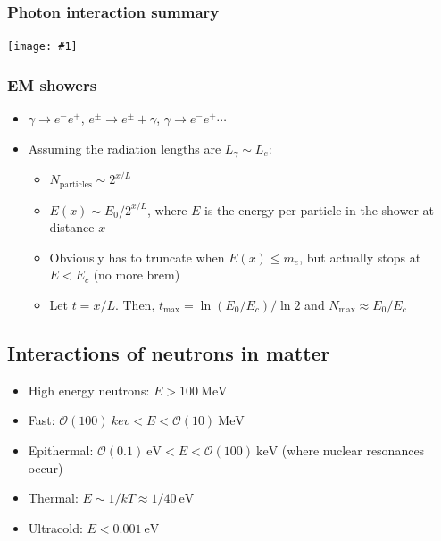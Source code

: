 \documentclass[11pt]{article}
\newcommand{\ev}{\text{eV}}
\newcommand{\kev}{\text{keV}}
\newcommand{\mev}{\text{MeV}}
\newcommand{\el}{\ensuremath{e^{-}}\xspace}
\newcommand{\pos}{\ensuremath{e^{+}}\xspace}
\newcommand{\ord}[1]{\ensuremath{\mathcal{O}(#1)}}
\newcommand{\embedimgw}[2]{\begin{center}\texttt{[image: \#1]}\end{center}}
\begin{document}
\subsubsection{Photon interaction summary}

\embedimgw{figs/sigma_photonInclusive.png}{.9}

\subsubsection{EM showers}
\begin{itemize}
  \item $\gamma\rightarrow\el\pos$, $e^\pm\rightarrow e^\pm+\gamma$, $\gamma\rightarrow\el\pos\cdots$
  \item Assuming the radiation lengths are $L_\gamma\sim L_e$:
  \begin{itemize}
    \item $N_\text{particles}\sim 2^{x/L}$
    \item $E(x)\sim E_0/2^{x/L}$, where $E$ is the energy per particle in the shower at distance $x$
    \item Obviously has to truncate when $E(x)\leq m_e$, but actually stops at $E<E_c$ (no more brem)
    \item Let $t=x/L$. Then, $t_{\max} = \ln(E_0/E_c)/\ln2$ and $N_{\max}\approx E_0/E_c$
  \end{itemize}
\end{itemize}

\subsection{Interactions of neutrons in matter}
\begin{itemize}
  \item High energy neutrons: $E>100~\mev$
  \item Fast: $\ord{100}~kev < E < \ord{10}~\mev$
  \item Epithermal: $\ord{0.1}~\ev < E <\ord{100}~\kev$ (where nuclear resonances occur)
  \item Thermal: $E\sim 1/kT \approx 1/40~\ev$
  \item Ultracold: $E<0.001~\ev$
\end{itemize}
\end{document}
